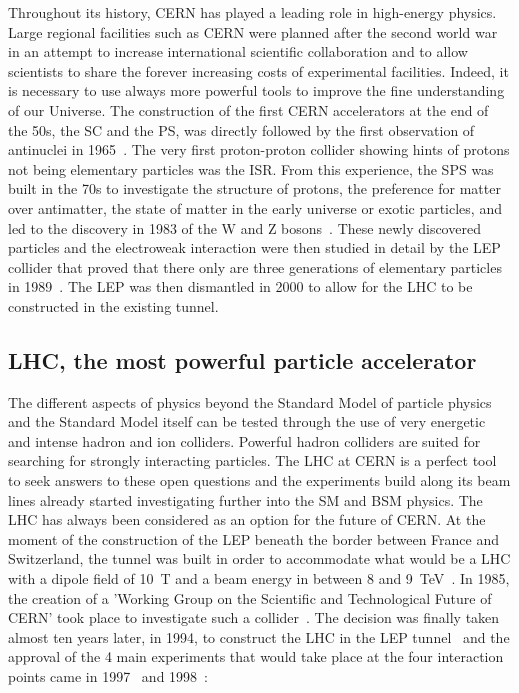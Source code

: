 	Throughout its history, CERN has played a leading role in high-energy physics. Large regional facilities such as CERN were planned after the second world war in an attempt to increase international scientific collaboration and to allow scientists to share the forever increasing costs of experimental facilities. Indeed, it is necessary to use always more powerful tools to improve the fine understanding of our Universe. The construction of the first CERN accelerators at the end of the 50s, the \acf{SC} and the \acf{PS}, was directly followed by the first observation of antinuclei in 1965~\cite{MASSAM1965}. The very first proton-proton collider showing hints of protons not being elementary particles was the \acf{ISR}. From this experience, the \acf{SPS} was built in the 70s to investigate the structure of protons, the preference for matter over antimatter, the state of matter in the early universe or exotic particles, and led to the discovery in 1983 of the W and Z bosons~\cite{UA1W1983,UA2W1983,UA1Z1983,UA2Z1983}. These newly discovered particles and the electroweak interaction were then studied in detail by the \acf{LEP} collider that proved that there only are three generations of elementary particles in 1989~\cite{ALEPH1989}. The LEP was then dismantled in 2000 to allow for the LHC to be constructed in the existing tunnel.

	\subsection{LHC, the most powerful particle accelerator}
	\label{chapt2:ssec:LHC}
	
	The different aspects of physics beyond the Standard Model of particle physics and the Standard Model itself can be tested through the use of very energetic and intense hadron and ion colliders. Powerful hadron colliders are suited for searching for strongly interacting particles. The LHC at CERN is a perfect tool to seek answers to these open questions and the experiments build along its beam lines already started investigating further into the SM and BSM physics. The LHC has always been considered as an option for the future of CERN. At the moment of the construction of the LEP beneath the border between France and Switzerland, the tunnel was built in order to accommodate what would be a \acl{LHC} with a dipole field of \SI{10}{T} and a beam energy in between 8 and \SI{9}{TeV}~\cite{ANNUALREPORT1984}. In 1985, the creation of a 'Working Group on the Scientific and Technological Future of CERN' took place to investigate such a collider~\cite{ANNUALREPORT1985}. The decision was finally taken almost ten years later, in 1994, to construct the LHC in the LEP tunnel~\cite{ANNUALREPORT1994} and the approval of the 4 main experiments that would take place at the four interaction points came in 1997~\cite{ANNUALREPORT1997} and 1998~\cite{ANNUALREPORT1998}:
	
